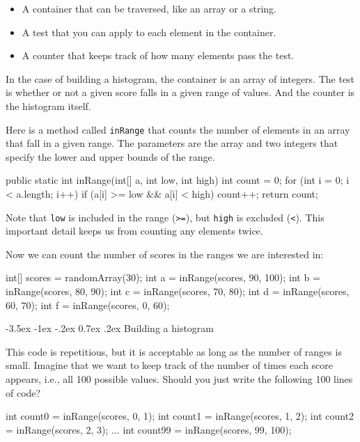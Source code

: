 \documentclass[12pt]{book}
\makeatletter
\theoremstyle{exercise}
\newcommand{\java}[1]{\verb"#1"}
\renewcommand{\section}{\@startsection {section}{1}{\z@}%
    {-3.5ex \@plus -1ex \@minus -.2ex}%
    {0.7ex \@plus.2ex}%
    {\normalfont\Large\bfseries}}
\newcommand{\java}[1]{\lstinline{#1}} %
\makeatother
\begin{document}
\begin{itemize}
\item A container that can be traversed, like an array or a string.
\item A test that you can apply to each element in the container.
\item A counter that keeps track of how many elements pass the test.
\end{itemize}

In the case of building a histogram, the container is an array of integers.
The test is whether or not a given score falls in a given range of values.
And the counter is the histogram itself.

Here is a method called \java{inRange} that counts the number of elements in an array that fall in a given range.
The parameters are the array and two integers that specify the lower and upper bounds of the range.

\begin{code}
public static int inRange(int[] a, int low, int high) {
    int count = 0;
    for (int i = 0; i < a.length; i++) {
        if (a[i] >= low && a[i] < high) {
            count++;
        }
    }
    return count;
}
\end{code}

Note that \java{low} is included in the range (\java{>=}), but \java{high} is excluded (\java{<}).
This important detail keeps us from counting any elements twice.

Now we can count the number of scores in the ranges we are interested in:

\begin{code}
    int[] scores = randomArray(30);
    int a = inRange(scores, 90, 100);
    int b = inRange(scores, 80, 90);
    int c = inRange(scores, 70, 80);
    int d = inRange(scores, 60, 70);
    int f = inRange(scores, 0, 60);
\end{code}


\section{Building a histogram}

This code is repetitious, but it is acceptable as long as the number of ranges is small.
Imagine that we want to keep track of the number of times each score appears, i.e., all 100 possible values.
Should you just write the following 100 lines of code?

\begin{code}
    int count0 = inRange(scores, 0, 1);
    int count1 = inRange(scores, 1, 2);
    int count2 = inRange(scores, 2, 3);
    ...
    int count99 = inRange(scores, 99, 100);
\end{code}
\end{document}
